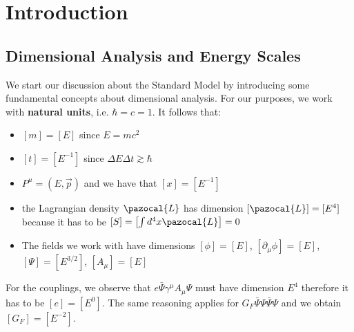 \documentclass[../main.tex]{subfiles}
\begin{document}
\setchapterpreamble[u]{\margintoc}
\chapter[Introduction]{Introduction\footnotemark[0]}
\section{Dimensional Analysis and Energy Scales}
We start our discussion about the Standard Model by introducing some fundamental concepts about dimensional analysis. For our purposes, we work with \textbf{natural units}, i.e. $\hbar=c=1$. It follows that:
\begin{itemize}
    \item $[m]=[E]$ since $E=mc^2$ 
    \item $[t]=[E^{-1}]$ since $\Delta E\Delta t\gtrsim\hbar$
    \item $P^\mu=(E,\Vec{p})$ and we have that $[x]=[E^{-1}]$
    \item the Lagrangian density $\pazocal{L}$ has dimension $[\pazocal{L}]=[E^4]$ because it has to be $[S]=\left[\int d^4x\pazocal{L}\right]=0$
    \item The fields we work with have dimensions $[\phi]=[E]$, $[\partial_\mu\phi]=[E]$, $[\Psi]=[E^{3/2}]$, $[A_\mu]=[E]$
\end{itemize}
For the couplings, we observe that $e\bar{\Psi}\gamma^\mu A_\mu\Psi$ must have dimension $E^4$ therefore it has to be $[e]=[E^0]$. The same reasoning applies for $G_F\bar{\Psi}\Psi\bar{\Psi}\Psi$ and we obtain $[G_F]=[E^{-2}]$.
\end{document}
